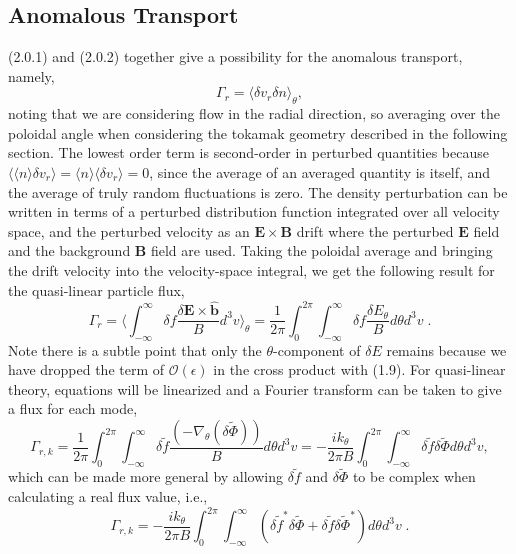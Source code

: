 \documentclass[12pt]{article}
\numberwithin{equation}{subsection}
\begin{document}
\subsection{Anomalous Transport}
   \quad (2.0.1) and (2.0.2) together give a possibility for the anomalous transport, namely,
   \begin{equation}
      \Gamma_r = \langle\delta v_r \delta n\rangle_\theta,
   \end{equation}
noting that we are considering flow in the radial direction, so averaging over the poloidal angle when considering the tokamak
geometry described in the following section. The lowest order term is second-order in perturbed quantities because
$\langle \langle n \rangle \delta v_r \rangle = \langle n \rangle \langle \delta v_r \rangle = 0$, since the average of an averaged
quantity is itself, and the average of truly random fluctuations is zero. The density perturbation can be written in terms of a
perturbed distribution function integrated over all velocity space, and the perturbed velocity as an $\bm{E}\times\bm{B}$ drift
where the perturbed $\bm{E}$ field and the background $\bm{B}$ field are used. Taking the poloidal average and bringing the drift
velocity into the velocity-space integral, we get the following result for the quasi-linear particle flux, 
   \begin{equation}
      \Gamma_r = \langle\int_{-\infty}^{\infty}\delta f \frac{\delta\bm{E}\times\bm{\hat{b}}}{B} d^{3}v\rangle_\theta
               = \frac{1}{2\pi}\int_{0}^{2\pi} \int_{-\infty}^{\infty}\delta f \frac{\delta E_\theta}{B}d\theta d^{3}v \;.
   \end{equation}
Note there is a subtle point that only the $\theta$-component of $\delta E$ remains because we have dropped the term of
$\mathcal{O}(\epsilon)$ in the cross product with (1.9). For quasi-linear theory, equations will be linearized
and a Fourier transform can be taken to give a flux for each mode,
   \begin{equation}
      \Gamma_{r,k} = \frac{1}{2\pi}\int_{0}^{2\pi} \int_{-\infty}^{\infty}\delta\widetilde{f}
                     \frac{(-\nabla_\theta(\delta\widetilde{\Phi}))}{B}d\theta d^{3}v
                   = -\frac{ik_\theta}{2\pi B}\int_{0}^{2\pi}\int_{-\infty}^{\infty}\delta\widetilde{f}
                     \delta\widetilde{\Phi}d\theta d^{3}v,
   \end{equation}
which can be made more general by allowing $\delta\widetilde{f}$ and $\delta\widetilde{\Phi}$ to be complex when calculating a real flux
value, i.e.,
   \begin{equation}
      \Gamma_{r,k} = -\frac{ik_\theta}{2\pi B}\int_{0}^{2\pi}\int_{-\infty}^{\infty} (\delta\widetilde{f}^*\delta\widetilde{\Phi}
                     + \delta\widetilde{f}\delta\widetilde{\Phi}^*)d\theta d^{3}v\;.
   \end{equation}
\end{document}
